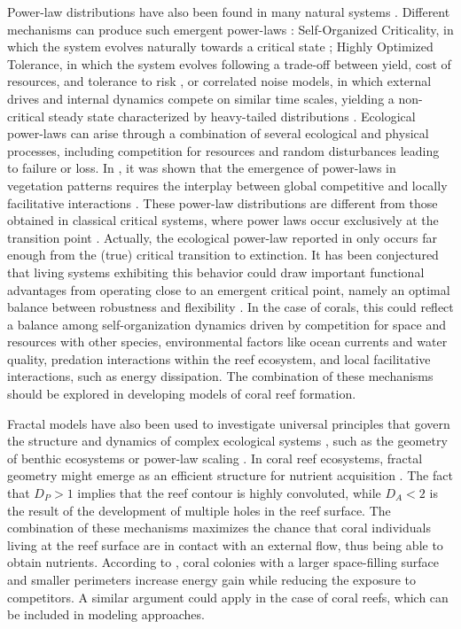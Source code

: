 Power-law distributions have also been found in many natural systems
\cite{SOLE1995, west2000scaling, Brown2002, Chave2003, Marquet2005,
    Corral2019}.
Different mechanisms can produce such emergent power-laws
\cite{Markovic2014}: Self-Organized Criticality, in which the system evolves
naturally towards a critical state \cite{Per1988}; Highly Optimized Tolerance,
in which the system evolves following a trade-off between yield, cost of
resources, and tolerance to risk \cite{Carlson1999,Carlson2000}, or correlated
noise models, in which external drives and internal dynamics compete on similar
time scales, yielding a non-critical steady state characterized by heavy-tailed
distributions \cite{Newman1996}. Ecological power-laws can arise through a
combination of several ecological and physical processes, including competition
for resources and random disturbances leading to failure or loss. In
\cite{Scanlon2007, Kefi2007}, it was shown that the emergence of power-laws in
vegetation patterns requires the interplay between global competitive and
locally facilitative interactions \cite{Scanlon2007, Kefi2007}. These power-law
distributions are different from those obtained in classical critical systems,
where power laws occur exclusively at the transition point
\cite{Wilson1979,Binney1995}. Actually, the ecological power-law reported in
\cite{Kefi2007} only occurs far enough from the (true) critical transition to
extinction. It has been conjectured that living systems exhibiting this
behavior could draw important functional advantages from operating close to an
emergent critical point, namely an optimal balance between robustness and
flexibility \cite{Munoz2018}. In the case of corals, this could reflect a
balance among self-organization dynamics driven by competition for space and
resources with other species, environmental factors like ocean currents and
water quality, predation interactions within the reef ecosystem, and local
facilitative interactions, such as energy dissipation. The combination of these
mechanisms should be explored in developing models of coral reef formation.

Fractal models have also been used to investigate universal principles that
govern the structure and dynamics of complex ecological systems
\cite{Brown2002}, such as the geometry of benthic ecosystems or power-law
scaling \cite{Schmid1999}. In coral reef ecosystems, fractal geometry might
emerge as an efficient structure for nutrient acquisition \cite{Sous2020}. The
fact that $D_P>1$ implies that the reef contour is highly convoluted, while
$D_A<2$ is the result of the development of multiple holes in the reef
surface. The combination of these mechanisms maximizes the chance that coral
individuals living at the reef surface are in contact with an external flow,
thus being able to obtain nutrients. According to \cite{George2021}, coral
colonies with a larger space-filling surface and smaller perimeters increase
energy gain while reducing the exposure to competitors. A similar argument
could apply in the case of coral reefs, which can be included in modeling
approaches.


